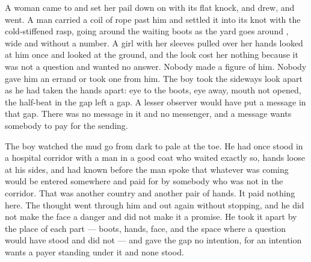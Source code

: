 A woman came to  and set her pail down on  with its flat knock, and drew, and went. A man carried a coil of rope past him and settled it into its knot with the cold-stiffened rasp, going around the waiting boots as the yard goes around , wide and without a number. A girl with her sleeves pulled over her hands looked at him once and looked at the ground, and the look cost her nothing because it was not a question and wanted no answer. Nobody made a figure of him. Nobody gave him an errand or took one from him. The boy took the sideways look apart as he had taken the hands apart: eye to the boots, eye away, mouth not opened, the half-beat in the gap left a gap. A lesser observer would have put a message in that gap. There was no message in it and no messenger, and a message wants somebody to pay for the sending.

The boy watched the mud go from dark to pale at the toe. He had once stood in a hospital corridor with a man in a good coat who waited exactly so, hands loose at his sides, and had known before the man spoke that whatever was coming would be entered somewhere and paid for by somebody who was not in the corridor. That was another country and another pair of hands. It paid nothing here. The thought went through him and out again without stopping, and he did not make the face a danger and did not make it a promise. He took it apart by the place of each part --- boots, hands, face, and the space where a question would have stood and did not --- and gave the gap no intention, for an intention wants a payer standing under it and none stood.

